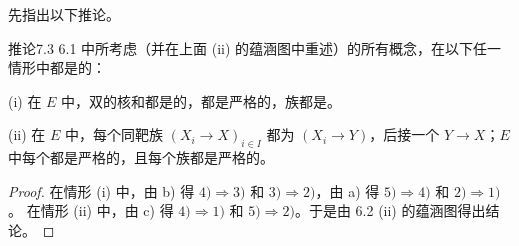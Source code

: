 先指出以下推论。
\begin{SGAresult}{推论}{7.3}
6.1 中所考虑（并在上面 (ii) 的蕴涵图中重述）的所有概念，在以下任一情形中都是的：

(i) 在 $E$ 中，双的核和都是的，都是严格的，族都是。

(ii) 在 $E$ 中，每个同靶族 $(X_i\to X)_{i\in I}$ 都为 $(X_i\to Y)$，后接一个 $Y\to X$；$E$ 中每个都是严格的，且每个族都是严格的。
\end{SGAresult}
\begin{proof}
在情形 (i) 中，由 b) 得 $4)\Rightarrow3)$ 和 $3)\Rightarrow2)$，由 a) 得 $5)\Rightarrow4)$ 和 $2)\Rightarrow1)$。
在情形 (ii) 中，由 c) 得 $4)\Rightarrow1)$ 和 $5)\Rightarrow2)$。于是由 6.2 (ii) 的蕴涵图得出结论。
\end{proof}
